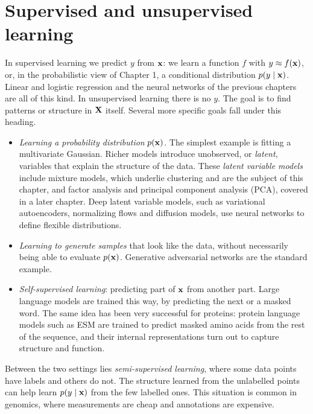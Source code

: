 \section{Supervised and unsupervised learning}

In supervised learning we predict $y$ from $\mathbf{x}$: we learn a function $f$ with $y\approx f(\mathbf{x})$, or, in the probabilistic view of Chapter 1, a conditional distribution $p(y\mid\mathbf{x})$. Linear and logistic regression and the neural networks of the previous chapters are all of this kind. In unsupervised learning there is no $y$. The goal is to find patterns or structure in $\mathbf{X}$ itself. Several more specific goals fall under this heading.
\begin{itemize}
  \item \emph{Learning a probability distribution} $p(\mathbf{x})$. The simplest example is fitting a multivariate Gaussian. Richer models introduce unobserved, or \emph{latent}, variables that explain the structure of the data. These \emph{latent variable models} include mixture models, which underlie clustering and are the subject of this chapter, and factor analysis and principal component analysis (PCA), covered in a later chapter. Deep latent variable models, such as variational autoencoders, normalizing flows and diffusion models, use neural networks to define flexible distributions.
  \item \emph{Learning to generate samples} that look like the data, without necessarily being able to evaluate $p(\mathbf{x})$. Generative adversarial networks are the standard example.
  \item \emph{Self-supervised learning}: predicting part of $\mathbf{x}$ from another part. Large language models are trained this way, by predicting the next or a masked word. The same idea has been very successful for proteins: protein language models such as ESM are trained to predict masked amino acids from the rest of the sequence, and their internal representations turn out to capture structure and function.
\end{itemize}
Between the two settings lies \emph{semi-supervised learning}, where some data points have labels and others do not. The structure learned from the unlabelled points can help learn $p(y\mid\mathbf{x})$ from the few labelled ones. This situation is common in genomics, where measurements are cheap and annotations are expensive.

